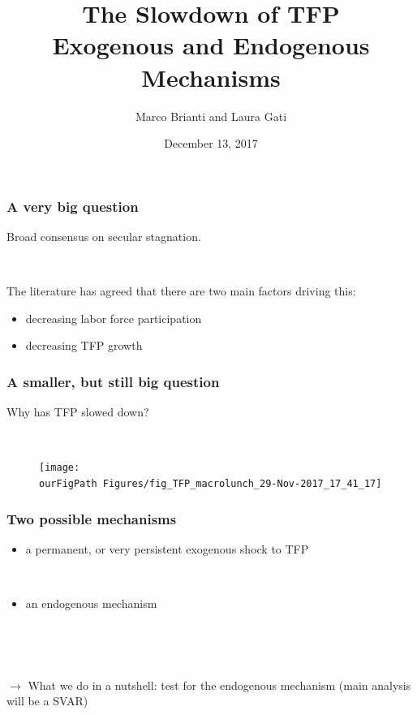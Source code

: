 \documentclass{beamer}
\author[Brianti, Gati]{Marco Brianti and Laura Gati}
\institute[Boston College]{Boston College}
\title{The Slowdown of TFP \\ Exogenous and Endogenous Mechanisms}
\date{December 13, 2017}
\def \ourFigPath {../../}
\begin{document}
\begin{frame}

\maketitle


\end{frame}

\begin{frame}
	\frametitle{A very big question}
	
Broad consensus on secular stagnation.


\

The literature has agreed that there are two main factors driving this:
\begin{itemize}
\item decreasing labor force participation
\item decreasing TFP growth
\end{itemize}
	
	


\end{frame}

\begin{frame}
	\frametitle{A smaller, but still big question}
	

	Why has TFP slowed down? 
	
	
	\
	
	
	\vspace{-1cm}
	\noindent
	\begin{figure}
		\centering
		\texttt{[image: \\ourFigPath Figures/fig\_TFP\_macrolunch\_29-Nov-2017\_17\_41\_17]}
	\end{figure}
	
	
\end{frame}

\begin{frame}
	\frametitle{Two possible mechanisms}
	
\begin{itemize}
\item a permanent, or very persistent exogenous shock to TFP

\

\item an endogenous mechanism
\end{itemize}	

\

\

$\rightarrow$ What we do in a nutshell: test for the endogenous mechanism (main analysis will be a SVAR)


\end{frame}
\end{document}

